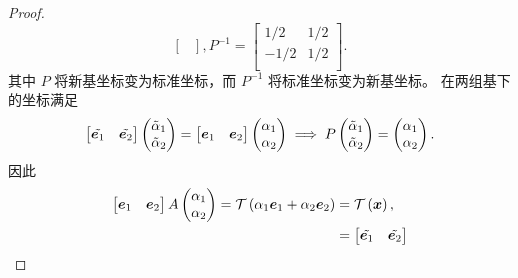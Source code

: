 \begin{proof}
\[{\begin{bmatrix}
\end{bmatrix}}, P^{-1} = \begin{bmatrix}
    1/2 & 1/2 \\
    -1/2 & 1/2 \\
\end{bmatrix}.
\]
其中 $P$ 将新基坐标变为标准坐标，而 $P^{-1}$ 将标准坐标变为新基坐标。
在两组基下的坐标满足
\[
\begin{aligned}
    \begin{bmatrix}
        \tilde{\boldsymbol{e}_1} & \tilde{\boldsymbol{e}_2} \\
    \end{bmatrix} \begin{pmatrix}
        \tilde{\alpha}_1 \\
        \tilde{\alpha}_2 \\
    \end{pmatrix} = \begin{bmatrix}
        \boldsymbol{e}_1 & \boldsymbol{e}_2 \\
    \end{bmatrix} \begin{pmatrix}
        \alpha_1 \\
        \alpha_2 \\
    \end{pmatrix}
\implies
P \begin{pmatrix}
    \tilde{\alpha}_1 \\
    \tilde{\alpha}_2 \\
\end{pmatrix} = \begin{pmatrix}
    \alpha_1 \\
    \alpha_2 \\
\end{pmatrix}.
\end{aligned}
\]
因此
\[
\begin{aligned}
    \begin{bmatrix}
        \boldsymbol{e}_1 & \boldsymbol{e}_2 \\
    \end{bmatrix} A \begin{pmatrix}
        \alpha_1 \\
        \alpha_2 \\
    \end{pmatrix} = \mathcal{T} \left(\alpha_1 \boldsymbol{e}_1 + \alpha_2 \boldsymbol{e}_2\right) &= \mathcal{T} \left(\boldsymbol{x}\right), \\
    &= \begin{bmatrix}
        \tilde{\boldsymbol{e}_1} & \tilde{\boldsymbol{e}_2} \\

\end{bmatrix}
\end{aligned}\]
\end{proof}
